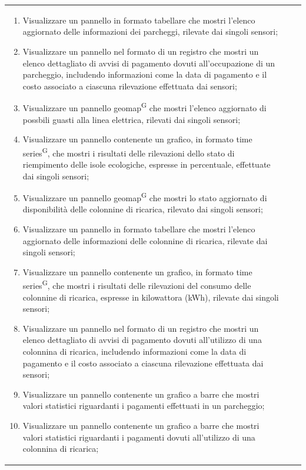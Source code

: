 \documentclass[8pt]{article}
\newcommand{\glossterm}[1]{#1\textsuperscript{G}} %
\begin{document}
\begin{longtable}{|>{\centering}p{2cm}|>{\RaggedRight}m{12cm}|>{\centering\arraybackslash}p{2cm}|}
\begin{enumerate}
            parcheggi, espresso tramite valori \glossterm{boolean} rilevati dai singoli sensori;
        \item Visualizzare un pannello in formato tabellare che mostri l'elenco aggiornato delle informazioni dei
            parcheggi, rilevate dai singoli sensori;
        \item Visualizzare un pannello nel formato di un registro che mostri un elenco dettagliato di
            avvisi di pagamento dovuti all'occupazione di un parcheggio, includendo informazioni come la data di pagamento e il costo
            associato a ciascuna rilevazione effettuata dai sensori;
        \item Visualizzare un pannello \glossterm{geomap} che mostri l'elenco aggiornato di possbili guasti alla linea elettrica, rilevati dai singoli sensori;
        \item Visualizzare un pannello contenente un grafico, in formato \glossterm{time series}, che mostri i
            risultati delle rilevazioni dello stato di riempimento delle isole ecologiche, espresse in percentuale, effettuate dai singoli sensori;
        \item Visualizzare un pannello \glossterm{geomap} che mostri lo stato aggiornato di disponibilità delle colonnine di ricarica,
            rilevato dai singoli sensori;
        \item Visualizzare un pannello in formato tabellare che mostri l'elenco aggiornato delle informazioni delle colonnine di ricarica,
            rilevate dai singoli sensori;
        \item Visualizzare un pannello contenente un grafico, in formato \glossterm{time series}, che mostri i
            risultati delle rilevazioni del consumo delle colonnine di ricarica, espresse in kilowattora (kWh), rilevate dai singoli sensori;
        \item Visualizzare un pannello nel formato di un registro che mostri un elenco dettagliato di
            avvisi di pagamento dovuti all'utilizzo di una colonnina di ricarica, includendo informazioni come la data di pagamento e il costo associato a ciascuna rilevazione effettuata dai sensori;
        \item Visualizzare un pannello contenente un grafico a barre che mostri valori statistici riguardanti i pagamenti effettuati in un parcheggio;
        \item Visualizzare un pannello contenente un grafico a barre che mostri valori statistici riguardanti i pagamenti dovuti all'utilizzo di una colonnina di ricarica;

\end{enumerate}
\end{longtable}
\end{document}
